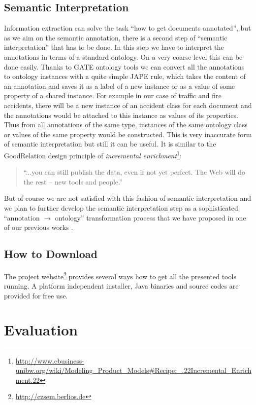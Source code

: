 \subsection{Semantic Interpretation}
\label{sec:SemanticInterpretation}
Information extraction can solve the task ``how to get documents annotated'', but as we aim on the semantic annotation, there is a second step of ``semantic interpretation'' that has to be done. In this step we have to interpret the annotations in terms of a standard ontology. On a very coarse level this can be done easily. Thanks to GATE ontology tools \citep{Bon04b} we can convert all the annotations to ontology instances with a quite simple JAPE \citep{Cunningham00jape:a} rule, which takes the content of an annotation and saves it as a label of a new instance or as a value of some property of a shared instance. For example in our case of traffic and fire accidents, there will be a new instance of an accident class for each document and the annotations would be attached to this instance as values of its properties. Thus from all annotations of the same type, instances of the same ontology class or values of the same property would be constructed. This is very inaccurate form of semantic interpretation but still it can be useful. It is similar to the GoodRelation \citep{DBLP:conf/ekaw/Hepp08} design principle of \emph{incremental enrichment}\footnote{\url{http://www.ebusiness-unibw.org/wiki/Modeling_Product_Models#Recipe:_.22Incremental_Enrichment.22}}:
\begin{quote}
``...you can still publish the data, even if not yet perfect. The Web will do the rest -- new tools and people.''	
\end{quote}

But of course we are not satisfied with this fashion of semantic interpretation and we plan to further develop the semantic interpretation step as a sophisticated ``annotation $\rightarrow$ ontology'' transformation process that we have proposed in one of our previous works \citep{biblio:DeVoComputingaggregations2008}.

\subsection{How to Download}
The project website\footnote{\url{http://czsem.berlios.de}} provides several ways how to get all the presented tools running. A platform independent installer, Java binaries and source codes are provided for free use.


\section{Evaluation}
\label{sec:evaluation}

